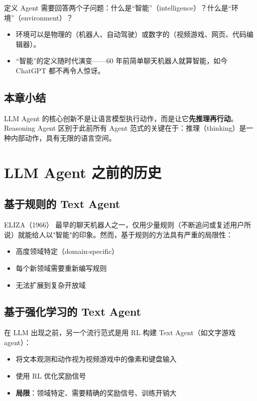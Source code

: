 \documentclass[a4paper]{article}
\begin{document}
定义 Agent 需要回答两个子问题：什么是``智能''（intelligence）？什么是``环境''（environment）？

\begin{itemize}
    \item 环境可以是物理的（机器人、自动驾驶）或数字的（视频游戏、网页、代码编辑器）。
    \item ``智能''的定义随时代演变——60 年前简单聊天机器人就算智能，如今 ChatGPT 都不再令人惊讶。
\end{itemize}

\subsection{本章小结}

LLM Agent 的核心创新不是让语言模型执行动作，而是让它\textbf{先推理再行动}。Reasoning Agent 区别于此前所有 Agent 范式的关键在于：推理（thinking）是一种内部动作，具有无限的语言空间。

\section{LLM Agent 之前的历史}

\subsection{基于规则的 Text Agent}

\begin{knowledgebox}{ELIZA（1966）}
最早的聊天机器人之一，仅用少量规则（不断追问或复述用户所说）就能给人以"智能"的印象。然而，基于规则的方法具有严重的局限性：
\begin{itemize}
    \item 高度领域特定（domain-specific）
    \item 每个新领域需要重新编写规则
    \item 无法扩展到复杂开放域
\end{itemize}
\end{knowledgebox}

\subsection{基于强化学习的 Text Agent}

在 LLM 出现之前，另一个流行范式是用 RL 构建 Text Agent（如文字游戏 agent）：

\begin{itemize}
    \item 将文本观测和动作视为视频游戏中的像素和键盘输入
    \item 使用 RL 优化奖励信号
    \item \textbf{局限}：领域特定、需要精确的奖励信号、训练开销大
\end{itemize}
\end{document}
